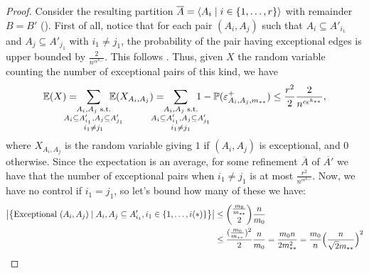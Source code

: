 \begin{lemma}
\begin{proof}
                Consider the resulting partition $\overline{A} = \left< A_i \mid i \in \{ 1, \dots, r \} \right>$ with remainder $B = B'$
                ().
                First of all, notice that for each pair $(A_i, A_j)$ such that $A_i \subseteq A'_{i_1}$ and
                $A_j \subseteq A'_{j_1}$ with $i_1 \neq j_1$, the probability of the pair having exceptional edges is
                upper bounded by $\frac{2}{n^{c\epsilon^{k_{**}}}}$.
                This follows .
                Thus, given $X$ the random variable counting the number of exceptional pairs of this kind, we have
                \[
                    \mathbb{E}(X) = \hspace{-1.6em} \sum_{\substack{A_i,A_j \text{ s.t.}\\A_i\subseteq A'_{i_1},A_j\subseteq A'_{j_1}\\i_1\neq j_1}} \hspace{-1.6em} \mathbb{E}(X_{A_i, A_j})
                         = \hspace{-1.6em} \sum_{\substack{A_i,A_j \text{ s.t.}\\A_i\subseteq A'_{i_1},A_j\subseteq A'_{j_1}\\i_1\neq j_1}} \hspace{-1.6em} 1 - \mathbb{P}(\varepsilon^+_{A_i, A_j,m_{**}})
                         \leq \frac{r^2}{2} \frac{2}{n^{c\epsilon^{k_{**}}}},
                \]
                where $X_{A_i,A_j}$ is the random variable giving $1$ if $(A_i, A_j)$ is exceptional, and $0$ otherwise.
                Since the expectation is an average, for some refinement $\overline{A}$ of $\overline{A'}$ we have that
                the number of exceptional pairs when $i_1 \neq j_1$ is at most $\frac{r^2}{n^{c\epsilon^{k_{**}}}}$.
                Now, we have no control if $i_1 = j_1$, so let's bound how many of these we have:
                \[
                    \begin{split}
                        \bparstraight{\bparcurly{\text{Exceptional } (A_i, A_j) \mid A_i, A_j \subseteq A'_{i_1}, i_1 \in \parcurly{1, \dots, i(*)}}}
                            & \leq {\frac{m_0}{m_{**}} \choose 2} \frac{n}{m_0} \\
                            & \leq \frac{\parround{\frac{m_0}{m_{**}}}^2}{2} \frac{n}{m_0}
                                = \frac{m_0 n}{2 m_{**}^2}
                                = \frac{m_0}{n} \bbparround{\frac{n}{\sqrt{2}m_{**}}}^2 \\

\end{split}\]
\end{proof}
\end{lemma}
